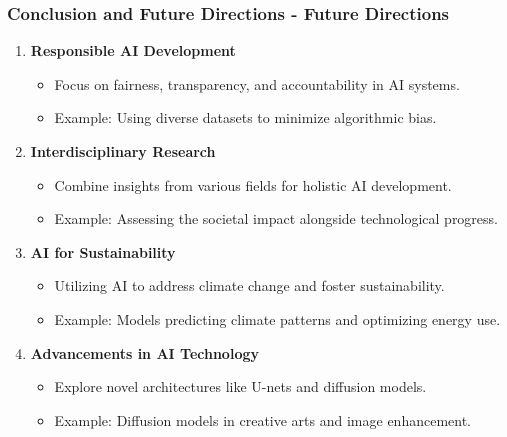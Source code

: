 \documentclass[aspectratio=169]{beamer}
\begin{document}
\begin{frame}[fragile]
    \frametitle{Conclusion and Future Directions - Future Directions}
    \begin{enumerate}
        \item \textbf{Responsible AI Development}
        \begin{itemize}
            \item Focus on fairness, transparency, and accountability in AI systems.
            \item Example: Using diverse datasets to minimize algorithmic bias.
        \end{itemize}
        
        \item \textbf{Interdisciplinary Research}
        \begin{itemize}
            \item Combine insights from various fields for holistic AI development.
            \item Example: Assessing the societal impact alongside technological progress.
        \end{itemize}
        
        \item \textbf{AI for Sustainability}
        \begin{itemize}
            \item Utilizing AI to address climate change and foster sustainability.
            \item Example: Models predicting climate patterns and optimizing energy use.
        \end{itemize}
        
        \item \textbf{Advancements in AI Technology}
        \begin{itemize}
            \item Explore novel architectures like U-nets and diffusion models.
            \item Example: Diffusion models in creative arts and image enhancement.
        \end{itemize}
    \end{enumerate}
\end{frame}
\end{document}
